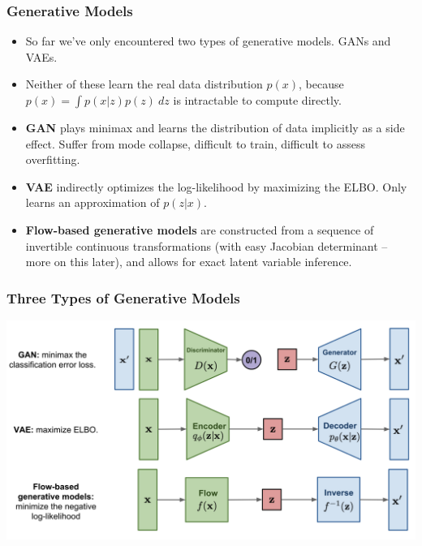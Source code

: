 \documentclass{beamer}
\begin{document}
\begin{frame}
  \frametitle{Generative Models}

  \begin{itemize}
    \item So far we've only encountered two types of generative models.
      GANs and VAEs.

    \item Neither of these learn the real data distribution $p(x)$,
      because $p(x) = \int p(x | z) p(z)\ dz$ is intractable to compute
      directly.

    \item \textbf{GAN} plays minimax and learns the distribution of data implicitly as a
      side effect. Suffer from mode collapse, difficult to train, difficult to assess
      overfitting.

    \item \textbf{VAE} indirectly optimizes the log-likelihood by maximizing the
      ELBO. Only learns an approximation of $p(z | x)$.

    \item \textbf{Flow-based generative models} are constructed from a sequence
      of invertible continuous transformations (with easy Jacobian determinant
      -- more on this later), and allows for exact latent variable inference.
  \end{itemize}

\end{frame}


\begin{frame}
  \frametitle{Three Types of Generative Models}

  \includegraphics[width=1.0\textwidth]{three-generative-models.png}
\end{frame}
\end{document}
